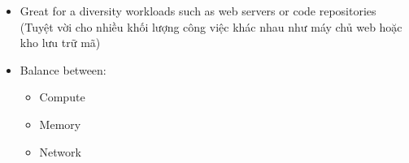 \begin{itemize}
	\item Great for a diversity workloads such as web servers or code repositories (Tuyệt vời cho nhiều khối lượng công việc khác nhau như máy chủ web hoặc kho lưu trữ mã)
	\item Balance between:
	\begin{itemize}
		\item Compute
		\item Memory
		\item Network
	\end{itemize}
\end{itemize}

















